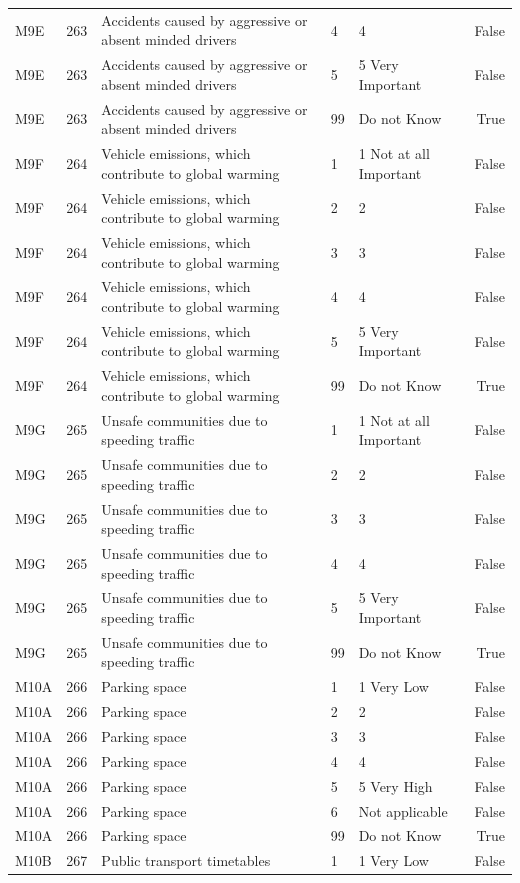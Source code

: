\begin{tabular}{lrlllr}
M9E & 263 & Accidents caused by aggressive or absent minded drivers & 4 & 4 & False \\
M9E & 263 & Accidents caused by aggressive or absent minded drivers & 5 & 5 Very Important & False \\
M9E & 263 & Accidents caused by aggressive or absent minded drivers & 99 & Do not Know & True \\
M9F & 264 & Vehicle emissions, which contribute to global warming & 1 & 1 Not at all Important & False \\
M9F & 264 & Vehicle emissions, which contribute to global warming & 2 & 2 & False \\
M9F & 264 & Vehicle emissions, which contribute to global warming & 3 & 3 & False \\
M9F & 264 & Vehicle emissions, which contribute to global warming & 4 & 4 & False \\
M9F & 264 & Vehicle emissions, which contribute to global warming & 5 & 5 Very Important & False \\
M9F & 264 & Vehicle emissions, which contribute to global warming & 99 & Do not Know & True \\
M9G & 265 & Unsafe communities due to speeding traffic & 1 & 1 Not at all Important & False \\
M9G & 265 & Unsafe communities due to speeding traffic & 2 & 2 & False \\
M9G & 265 & Unsafe communities due to speeding traffic & 3 & 3 & False \\
M9G & 265 & Unsafe communities due to speeding traffic & 4 & 4 & False \\
M9G & 265 & Unsafe communities due to speeding traffic & 5 & 5 Very Important & False \\
M9G & 265 & Unsafe communities due to speeding traffic & 99 & Do not Know & True \\
M10A & 266 & Parking space & 1 & 1 Very Low & False \\
M10A & 266 & Parking space & 2 & 2 & False \\
M10A & 266 & Parking space & 3 & 3 & False \\
M10A & 266 & Parking space & 4 & 4 & False \\
M10A & 266 & Parking space & 5 & 5 Very High & False \\
M10A & 266 & Parking space & 6 & Not applicable & False \\
M10A & 266 & Parking space & 99 & Do not Know & True \\
M10B & 267 & Public transport timetables & 1 & 1 Very Low & False \\

\end{tabular}
